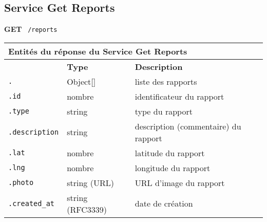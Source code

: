 \subsection{Service Get Reports}
\label{appendix:sprint3-reports-get-doc}

\textbf{GET} \ \texttt{/reports}

\begin{table}[H]
    \centering
    \begin{tabularx}{\textwidth}{@{}p{3cm} p{3.5cm} p{7.5cm}@{}}
        \multicolumn{3}{X}{\textbf{Entités du réponse du Service Get Reports}} \\
        \toprule
        \rowcolor{gray!20}
        \multicolumn{1}{l}{\textbf{Élément}} &
        \multicolumn{1}{l}{\textbf{Type}} &
        \multicolumn{1}{l}{\textbf{Description}} \\
        \midrule
        \verb|.| & Object[] & liste des rapports \\
        \verb|.id| & nombre & identificateur du rapport \\
        \verb|.type| & string & type du rapport \\
        \verb|.description| & string & description (commentaire) du rapport \\
        \verb|.lat| & nombre & latitude du rapport \\
        \verb|.lng| & nombre & longitude du rapport \\
        \verb|.photo| & string (URL) & URL d'image du rapport \\
        \verb|.created_at| & string (RFC3339) & date de création \\
        \bottomrule
    \end{tabularx}
\end{table}
